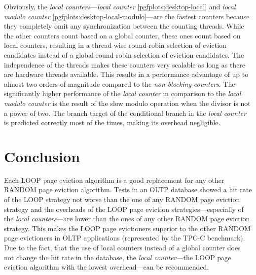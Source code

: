 \begin{@empty}
    Obviously, the \emph{local counters}---\emph{local counter} \ref{pgfplots:desktop-local} and \emph{local modulo counter} \ref{pgfplots:desktop-local-modulo}---are the fastest counters because they completely omit any synchronization between the counting threads. While the other counters count based on a global counter, these ones count based on local counters, resulting in a thread-wise round-robin selection of eviction candidates instead of a global round-robin selection of eviction candidates. The independence of the threads makes these counters very scalable as long as there are hardware threads available. This results in a performance advantage of up to almost two orders of magnitude compared to the \emph{non-blocking counters}. The significantly higher performance of the \emph{local counter} in comparison to the \emph{local modulo counter} is the result of the slow modulo operation when the divisor is not a power of two. The branch target of the conditional branch in the \emph{local counter} is predicted correctly most of the times, making its overhead negligible.
\end{@empty}

\section{Conclusion}

    Each LOOP page eviction algorithm is a good replacement for any other RANDOM page eviction algorithm. Tests in an OLTP database showed a hit rate of the LOOP strategy not worse than the one of any RANDOM page eviction strategy and the overheads of the LOOP page eviction strategies---especially of the \emph{local counters}---are lower than the ones of any other RANDOM page eviction strategy. This makes the LOOP page evictioners superior to the other RANDOM page evictioners in OLTP applications (represented by the TPC-C benchmark). Due to the fact, that the use of local counters instead of a global counter does not change the hit rate in the database, the \emph{local counter}---the LOOP page eviction algorithm with the lowest overhead---can be recommended.
